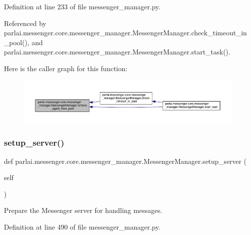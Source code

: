 Definition at line 233 of file messenger\+\_\+manager.\+py.



Referenced by parlai.\+messenger.\+core.\+messenger\+\_\+manager.\+Messenger\+Manager.\+check\+\_\+timeout\+\_\+in\+\_\+pool(), and parlai.\+messenger.\+core.\+messenger\+\_\+manager.\+Messenger\+Manager.\+start\+\_\+task().

Here is the caller graph for this function\+:
\nopagebreak
\begin{figure}[H]
\begin{center}
\leavevmode
\includegraphics[width=350pt]{classparlai_1_1messenger_1_1core_1_1messenger__manager_1_1MessengerManager_a39c02eecd48359b564bddc86897cae4c_icgraph}
\end{center}
\end{figure}
\mbox{\label{classparlai_1_1messenger_1_1core_1_1messenger__manager_1_1MessengerManager_a95f5de1ee4123af1ed3617ea6ac5ff13}} 
\subsubsection{\texorpdfstring{setup\+\_\+server()}{setup\_server()}}
{\footnotesize\ttfamily def parlai.\+messenger.\+core.\+messenger\+\_\+manager.\+Messenger\+Manager.\+setup\+\_\+server (\begin{DoxyParamCaption}\item[{}]{self }\end{DoxyParamCaption})}

\begin{DoxyVerb}Prepare the Messenger server for handling messages.\end{DoxyVerb}
 

Definition at line 490 of file messenger\+\_\+manager.\+py.



